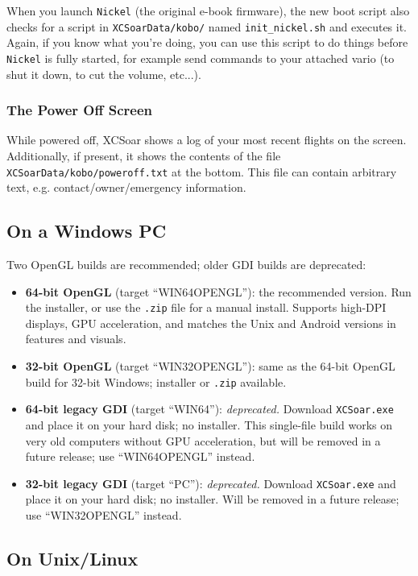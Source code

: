 When you launch \texttt{Nickel} (the original e-book firmware), the new
boot script also checks for a script in \texttt{XCSoarData/kobo/} named
\texttt{init\_nickel.sh} and executes it. Again, if
you know what you're doing, you can use this script to do things
before \texttt{Nickel} is fully started, for example send commands
to your attached vario (to shut it down, to cut the volume, etc...).

\subsubsection{The Power Off Screen}

While powered off, XCSoar shows a log of your most recent flights on
the screen.  Additionally, if present, it shows the contents of the
file \texttt{XCSoarData/kobo/poweroff.txt} at the bottom.  This file
can contain arbitrary text, e.g. contact/owner/emergency information.

\subsection*{On a Windows PC}

Two OpenGL builds are recommended; older GDI builds are deprecated:
\begin{itemize}
\item \textbf{64-bit OpenGL} (target ``WIN64OPENGL''): the recommended
  version. Run the installer, or use the \verb|.zip| file for a manual
  install. Supports high-DPI displays, GPU acceleration, and matches the
  Unix and Android versions in features and visuals.
\item \textbf{32-bit OpenGL} (target ``WIN32OPENGL''): same as the 64-bit
  OpenGL build for 32-bit Windows; installer or \verb|.zip| available.
\item \textbf{64-bit legacy GDI} (target ``WIN64''): \emph{deprecated.}
  Download \verb|XCSoar.exe| and place it on your hard disk; no installer.
  This single-file build works on very old computers without GPU
  acceleration, but will be removed in a future release; use
  ``WIN64OPENGL'' instead.
\item \textbf{32-bit legacy GDI} (target ``PC''): \emph{deprecated.}
  Download \verb|XCSoar.exe| and place it on your hard disk; no installer.
  Will be removed in a future release; use ``WIN32OPENGL'' instead.
\end{itemize}

\subsection*{On Unix/Linux}

